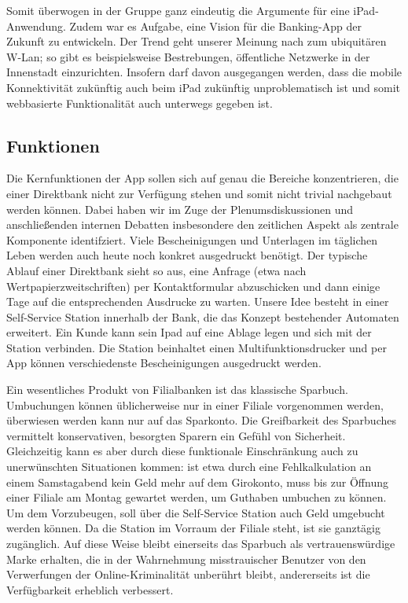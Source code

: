     
    Somit überwogen in der Gruppe ganz eindeutig die Argumente für eine iPad-Anwendung. Zudem war es Aufgabe, eine Vision für die Banking-App der Zukunft zu entwickeln. Der Trend geht unserer Meinung nach zum ubiquitären W-Lan; so gibt es beispielsweise Bestrebungen, öffentliche Netzwerke in der Innenstadt einzurichten. Insofern darf davon ausgegangen werden, dass die mobile Konnektivität zukünftig auch beim iPad zukünftig unproblematisch ist und somit webbasierte Funktionalität auch unterwegs gegeben ist.
    

\subsection{Funktionen}
    Die Kernfunktionen der App sollen sich auf genau die Bereiche konzentrieren, die einer Direktbank nicht zur Verfügung stehen und somit nicht trivial nachgebaut werden können. Dabei haben wir im Zuge der Plenumsdiskussionen und anschließenden internen Debatten insbesondere den zeitlichen Aspekt als zentrale Komponente identifziert. Viele Bescheinigungen und Unterlagen im täglichen Leben werden auch heute noch konkret ausgedruckt benötigt. Der typische Ablauf einer Direktbank sieht so aus, eine Anfrage (etwa nach Wertpapierzweitschriften) per Kontaktformular abzuschicken und dann einige Tage auf die entsprechenden Ausdrucke zu warten. Unsere Idee besteht in einer Self-Service Station innerhalb der Bank, die das Konzept bestehender Automaten erweitert. Ein Kunde kann sein Ipad auf eine Ablage legen und sich mit der Station verbinden. Die Station beinhaltet einen Multifunktionsdrucker und per App können verschiedenste Bescheinigungen ausgedruckt werden. 
    
    Ein wesentliches Produkt von Filialbanken ist das klassische Sparbuch. Umbuchungen können üblicherweise nur in einer Filiale vorgenommen werden, überwiesen werden kann nur auf das Sparkonto. Die Greifbarkeit des Sparbuches vermittelt konservativen, besorgten Sparern ein Gefühl von Sicherheit. Gleichzeitig kann es aber durch diese funktionale Einschränkung auch zu unerwünschten Situationen kommen: ist etwa durch eine Fehlkalkulation an einem Samstagabend kein Geld mehr auf dem Girokonto, muss bis zur Öffnung einer Filiale am Montag gewartet werden, um Guthaben umbuchen zu können. Um dem Vorzubeugen, soll über die Self-Service Station auch Geld umgebucht werden können. Da die Station im Vorraum der Filiale steht, ist sie ganztägig zugänglich. Auf diese Weise bleibt einerseits das Sparbuch als vertrauenswürdige Marke erhalten, die in der Wahrnehmung misstrauischer Benutzer von den Verwerfungen der Online-Kriminalität unberührt bleibt, andererseits ist die Verfügbarkeit erheblich verbessert.
    
